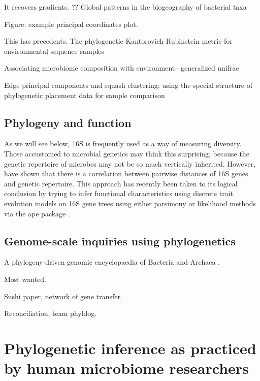 \documentclass{amsart}
\begin{document}
It recovers gradients.
\cite{nemergut2011global}
?? Global patterns in the biogeography of bacterial taxa

Figure: example principal coordinates plot.

This has precedents.
\cite{evans2012phylogenetic}
The phylogenetic Kantorovich-Rubinstein metric for environmental sequence samples

\cite{BikEaMicrobiotaStomach06}
\cite{PurdomAnalyzingDataGraphs08}

\cite{chen2012associating}
Associating microbiome composition with environment-- generalized unifrac

\cite{matsen2013edge}
Edge principal components and squash clustering: using the special structure of phylogenetic placement data for sample comparison



\subsection{Phylogeny and function}

As we will see below, 16S is frequently used as a way of measuring diversity.
Those accustomed to microbial genetics may think this surprising, because the genetic repertoire of microbes may not be so much vertically inherited.
However, \citep{zaneveld2010ribosomal} have shown that there is a correlation between pairwise distances of 16S genes and genetic repertoire.
This approach has recently been taken to its logical conclusion by trying to infer functional characteristics using discrete trait evolution models on 16S gene trees \citep{langille2013predictive} using either parsimony \citep{kluge1969quantitative} or likelihood \citep{pagel1994detecting} methods via the ape package \citep{paradis2004ape}.


\subsection{Genome-scale inquiries using phylogenetics}

A phylogeny-driven genomic encyclopaedia of Bacteria and Archaea \cite{wu2009phylogeny}.

Most wanted.

Sushi paper, network of gene transfer.

Reconciliation, team phyldog.


\section{Phylogenetic inference as practiced by human microbiome researchers}
\end{document}
